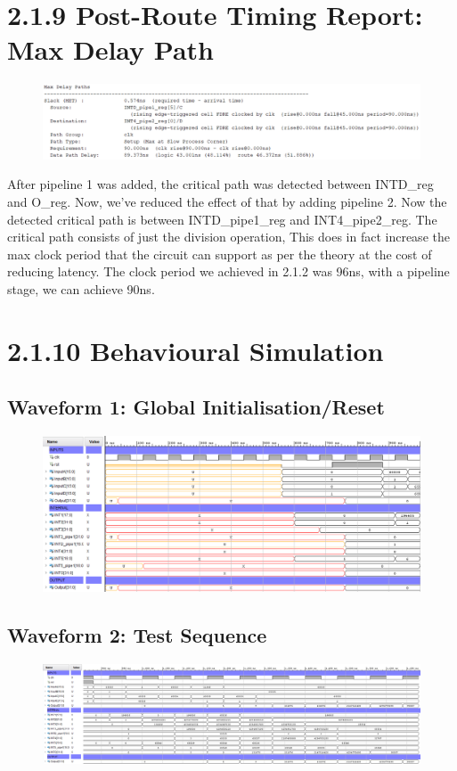 \documentclass[11pt]{report}
\begin{document}
\section*{2.1.9 Post-Route Timing Report: Max Delay Path}
\begin{figure}[H]
    \includegraphics[width=\columnwidth]{Reports/Lab3/Assets/2.1.9_max-delay-path.png}
\end{figure}
After pipeline 1 was added, the critical path was detected between INTD\_reg and O\_reg. Now, we've reduced the effect of that by adding pipeline 2. Now the detected critical path is between INTD\_pipe1\_reg and INT4\_pipe2\_reg. The critical path consists of just the division operation, This does in fact increase the max clock period that the circuit can support as per the theory at the cost of reducing latency. The clock period we achieved in 2.1.2 was 96ns, with a pipeline stage, we can achieve 90ns.

\section*{2.1.10 Behavioural Simulation}

\subsection*{Waveform 1: Global Initialisation/Reset}
\begin{figure}[H]
    \includegraphics[width=\columnwidth]{Reports/Lab3/Assets/2.1.10_waveform-initial-reset.png}
\end{figure}

\subsection*{Waveform 2: Test Sequence}
\begin{figure}[H]
    \includegraphics[width=\columnwidth]{Reports/Lab3/Assets/2.1.10_waveform-test-sequence.png}
\end{figure}
\end{document}
